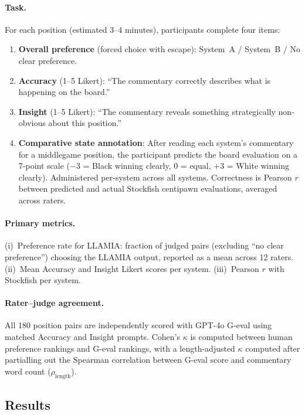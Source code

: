 \paragraph{Task.}
For each position (estimated 3--4 minutes), participants complete four items:
\begin{enumerate}[leftmargin=*, itemsep=2pt]
  \item \textbf{Overall preference} (forced choice with escape): System~A / System~B / No clear preference.
  \item \textbf{Accuracy} (1--5 Likert): ``The commentary correctly describes what is happening on the board.''
  \item \textbf{Insight} (1--5 Likert): ``The commentary reveals something strategically non-obvious about this position.''
  \item \textbf{Comparative state annotation}: After reading each system's commentary for a middlegame position, the participant predicts the board evaluation on a 7-point scale ($-3$ = Black winning clearly, $0$ = equal, $+3$ = White winning clearly). Administered per-system across all systems. Correctness is Pearson $r$ between predicted and actual Stockfish centipawn evaluations, averaged across raters.
\end{enumerate}

\paragraph{Primary metrics.}
(i)~Preference rate for LLAMIA: fraction of judged pairs (excluding ``no clear preference'') choosing the LLAMIA output, reported as a mean across 12 raters. (ii)~Mean Accuracy and Insight Likert scores per system. (iii)~Pearson $r$ with Stockfish per system.

\paragraph{Rater--judge agreement.}
All 180 position pairs are independently scored with GPT-4o G-eval \citep{liu2023gevalnlgevaluationusing} using matched Accuracy and Insight prompts. Cohen's $\kappa$ is computed between human preference rankings and G-eval rankings, with a length-adjusted $\kappa$ computed after partialling out the Spearman correlation between G-eval score and commentary word count ($\rho_{\text{length}}$).

\subsection{Results}
\label{sec:app_human_results}

